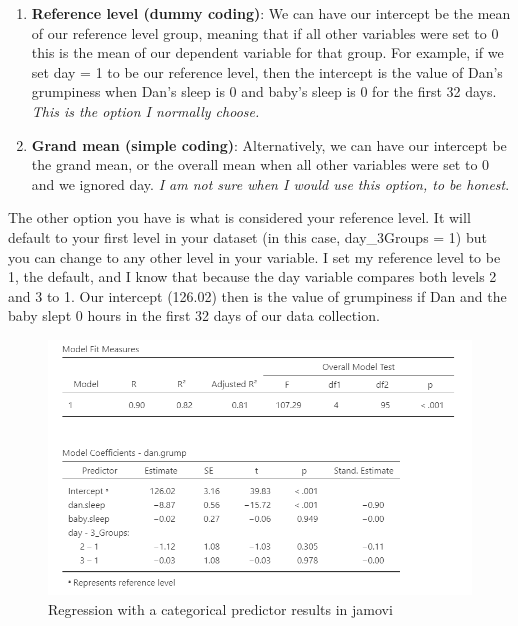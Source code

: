 \documentclass[
]{book}
\providecommand{\tightlist}{%
  \setlength{\itemsep}{0pt}\setlength{\parskip}{0pt}}
\begin{document}
\begin{enumerate}
\def\labelenumi{\arabic{enumi}.}
\tightlist
\item
  \textbf{Reference level (dummy coding)}: We can have our intercept be the mean of our reference level group, meaning that if all other variables were set to 0 this is the mean of our dependent variable for that group. For example, if we set day = 1 to be our reference level, then the intercept is the value of Dan's grumpiness when Dan's sleep is 0 and baby's sleep is 0 for the first 32 days. \emph{This is the option I normally choose.}
\item
  \textbf{Grand mean (simple coding)}: Alternatively, we can have our intercept be the grand mean, or the overall mean when all other variables were set to 0 and we ignored day. \emph{I am not sure when I would use this option, to be honest}.
\end{enumerate}

The other option you have is what is considered your reference level. It will default to your first level in your dataset (in this case, day\_3Groups = 1) but you can change to any other level in your variable. I set my reference level to be 1, the default, and I know that because the day variable compares both levels 2 and 3 to 1. Our intercept (126.02) then is the value of grumpiness if Dan and the baby slept 0 hours in the first 32 days of our data collection.

\begin{figure}

{\centering \includegraphics[width=1\linewidth]{images/13-regression/regression-categorical} 

}

\caption{Regression with a categorical predictor results in jamovi}\label{fig:unnamed-chunk-14}
\end{figure}
\end{document}
